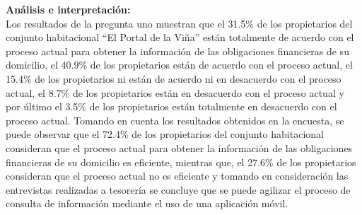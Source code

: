 \textbf{Análisis e interpretación:}\\
Los resultados de la pregunta uno muestran que el 31.5\% de los propietarios del conjunto habitacional {\textquotedblleft}El Portal de la Viña{\textquotedblright} están totalmente de acuerdo con el proceso actual para obtener la información de las obligaciones financieras de su domicilio, el 40.9\% de los propietarios están de acuerdo con el proceso actual, el 15.4\% de los propietarios ni están de acuerdo ni en desacuerdo con el proceso actual, el 8.7\% de los propietarios están en desacuerdo con el proceso actual y por último el 3.5\% de los propietarios están totalmente en desacuerdo con el proceso actual.
Tomando en cuenta los resultados obtenidos en la encuesta, se puede observar que el 72.4\% de los propietarios del conjunto habitacional consideran que el proceso actual para obtener la información de las obligaciones financieras de su domicilio es eficiente, mientras que, el 27.6\% de los propietarios consideran que el proceso actual no es eficiente y tomando en consideración las entrevistas realizadas a tesorería se concluye que se puede agilizar el proceso de consulta de información mediante el uso de una aplicación móvil.
\bigbreak

